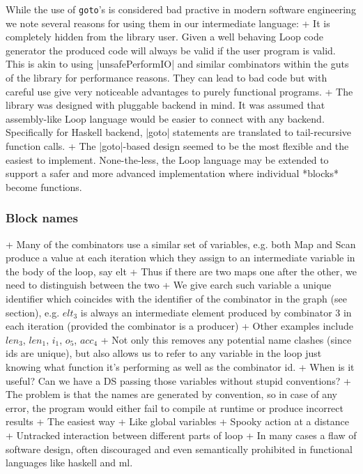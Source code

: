 While the use of \texttt{goto}'s is considered bad practive in modern software engineering we note several reasons for using them in our intermediate language:
+ It is completely hidden from the library user. Given a well behaving Loop code generator the produced code will always be valid if the user program is valid. This is akin to using |unsafePerformIO| and similar combinators within the guts of the library for performance reasons. They can lead to bad code but with careful use give very noticeable advantages to purely functional programs.
+ The library was designed with pluggable backend in mind. It was assumed that assembly-like Loop language would be easier to connect with any backend. Specifically for Haskell backend, |goto| statements are translated to tail-recursive function calls.
+ The |goto|-based design seemed to be the most flexible and the easiest to implement. None-the-less, the Loop language may be extended to support a safer and more advanced implementation where individual *blocks* become functions.


\subsubsection{Block names}


+ Many of the combinators use a similar set of variables, e.g. both Map and Scan produce a value at each iteration which they assign to an intermediate variable in the body of the loop, say elt
+ Thus if there are two maps one after the other, we need to distinguish between the two
+ We give earch such variable a unique identifier which coincides with the identifier of the combinator in the graph (see section), e.g. $elt_3$ is always an intermediate element produced by combinator 3 in each iteration (provided the combinator is a producer)
+ Other examples include $len_3$, $len_1$, $i_1$, $o_5$, $acc_4$
+ Not only this removes any potential name clashes (since ids are unique), but also allows us to refer to any variable in the loop just knowing what function it's performing as well as the combinator id.
+ When is it useful? Can we have a DS passing those variables without stupid conventions?
+ The problem is that the names are generated by convention, so in case of any error, the program would either fail to compile at runtime or produce incorrect results
+ The easiest way 
+ Like global variables
+ Spooky action at a distance
+ Untracked interaction between different parts of loop
+ In many cases a flaw of software design, often discouraged and even semantically prohibited in functional languages like haskell and ml.



